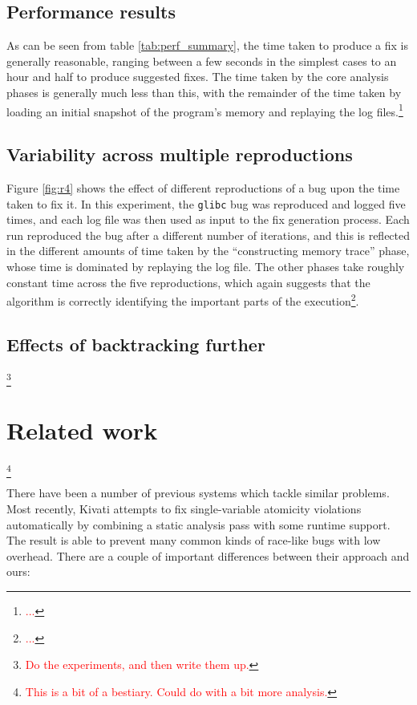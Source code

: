\documentclass[10pt,twocolumn,preprint,natbib,authoryear]{sigplanconf}
\newcommand{\editorial}[1]{\textcolor{red}{\footnote{\textcolor{red}{#1}}}}
\begin{document}
\subsection{Performance results}

As can be seen from table \ref{tab:perf_summary}, the time taken to
produce a fix is generally reasonable, ranging between a few seconds
in the simplest cases to an hour and half to produce suggested fixes.
The time taken by the core analysis phases is generally much less than
this, with the remainder of the time taken by loading an initial
snapshot of the program's memory and replaying the log
files.\editorial{...}

\subsection{Variability across multiple reproductions}

Figure \ref{fig:r4} shows the effect of different reproductions of a
bug upon the time taken to fix it.  In this experiment, the
\verb|glibc| bug was reproduced and logged five times, and each log
file was then used as input to the fix generation process.  Each run
reproduced the bug after a different number of iterations, and this is
reflected in the different amounts of time taken by the ``constructing
memory trace'' phase, whose time is dominated by replaying the log
file.  The other phases take roughly constant time across the five
reproductions, which again suggests that the algorithm is correctly
identifying the important parts of the execution\editorial{...}.

\subsection{Effects of backtracking further}
\label{sect:eval:backtrack}

\editorial{Do the experiments, and then write them up.}

\section{Related work}\editorial{This is a bit of a bestiary.  Could do with a bit more analysis.}

There have been a number of previous systems which tackle similar
problems.  Most recently, Kivati\cite{Chew2010a} attempts to fix
single-variable atomicity violations automatically by combining a
static analysis pass with some runtime support.  The result is able to
prevent many common kinds of race-like bugs with low overhead.  There
are a couple of important differences between their approach and ours:
\end{document}
